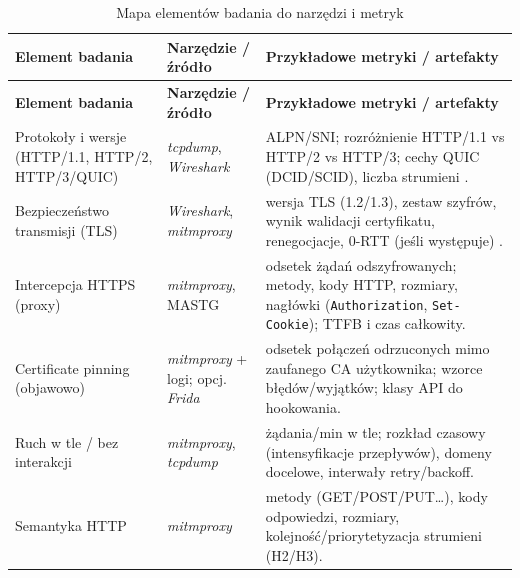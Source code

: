\begingroup
\setlength{\tabcolsep}{4pt}
\renewcommand{\arraystretch}{1.12}
\begin{longtable}{@{}p{}p{}p{}@{}}
\caption{Mapa elementów badania do narzędzi i metryk}
\label{tab:mapa-elementow-compat}\\
\toprule
\multicolumn{1}{l}{\textbf{Element badania}} &
\multicolumn{1}{l}{\textbf{Narzędzie / źródło}} &
\multicolumn{1}{l}{\textbf{Przykładowe metryki / artefakty}} \\
\midrule
\endfirsthead

\toprule
\multicolumn{1}{l}{\textbf{Element badania}} &
\multicolumn{1}{l}{\textbf{Narzędzie / źródło}} &
\multicolumn{1}{l}{\textbf{Przykładowe metryki / artefakty}} \\
\midrule
\endhead

\bottomrule
\endfoot

Protokoły i wersje (HTTP/1.1, HTTP/2, HTTP/3/QUIC) &
\textit{tcpdump}, \textit{Wireshark} \cite{tcpdump,WiresharkDocs} &
ALPN/SNI; rozróżnienie HTTP/1.1 vs HTTP/2 vs HTTP/3; cechy QUIC (DCID/SCID), liczba strumieni \cite{RFC9113,RFC9114,RFC9000}. \\[2pt]

Bezpieczeństwo transmisji (TLS) &
\textit{Wireshark}, \textit{mitmproxy} \cite{WiresharkDocs,MitmproxyDocs} &
wersja TLS (1.2/1.3), zestaw szyfrów, wynik walidacji certyfikatu, renegocjacje, 0-RTT (jeśli występuje) \cite{RFC8446}. \\[2pt]

Intercepcja HTTPS (proxy) &
\textit{mitmproxy}, MASTG \cite{MitmproxyDocs,OWASPMASTGIntercept} &
odsetek żądań odszyfrowanych; metody, kody HTTP, rozmiary, nagłówki (\texttt{Authorization}, \texttt{Set-Cookie}); TTFB i czas całkowity. \\[2pt]

Certificate pinning (objawowo) &
\textit{mitmproxy} + logi; opcj. \textit{Frida} \cite{Frida,OWASPMASTGPinning} &
odsetek połączeń odrzuconych mimo zaufanego CA użytkownika; wzorce błędów/wyjątków; klasy API do hookowania. \\[2pt]

Ruch w tle / bez interakcji &
\textit{mitmproxy}, \textit{tcpdump} \cite{MitmproxyDocs,tcpdump} &
żądania/min w tle; rozkład czasowy (intensyfikacje przepływów), domeny docelowe, interwały retry/backoff. \\[2pt]

Semantyka HTTP &
\textit{mitmproxy} \cite{MitmproxyDocs} &
metody (GET/POST/PUT…), kody odpowiedzi, rozmiary, kolejność/priorytetyzacja strumieni (H2/H3). \\[2pt]


\end{longtable}
